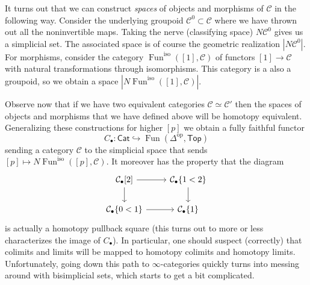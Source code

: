 \documentclass{amsart}
\DeclareMathOperator{\Fun}{Fun}
\begin{document}
It turns out that we can construct \textit{spaces} of objects and morphisms of $\mathcal{C}$ in the following way.
Consider the underlying groupoid $\mathcal{C}^0\subset \mathcal{C}$ where
we have thrown out all the noninvertible maps. Taking the nerve (classifying space) $N\mathcal{C}^0$
gives us a simplicial set. The associated space is of course the geometric realization $|N\mathcal{C}^0|$. 
For morphisms, consider the category $\Fun^\text{iso}([1], \mathcal{C})$ of functors $[1]\to\mathcal{C}$
with natural transformations through isomorphisms. This category is a also a groupoid, so we obtain
a space $|N\Fun^\text{iso}([1],\mathcal{C})|$.

Observe now that if we have two equivalent categories $\mathcal{C}\simeq \mathcal{C}'$ then
the spaces of objects and morphisms that we have defined above will be homotopy equivalent.
Generalizing these constructions for higher $[p]$ we obtain a fully faithful functor
\begin{equation*}
    C_\bullet:\mathsf{Cat}\hookrightarrow \Fun(\Delta^\text{op},\mathsf{Top})
\end{equation*}
sending a category $\mathcal{C}$ to the simplicial space that sends $[p]\mapsto N\Fun^\text{iso}([p],\mathcal{C})$.
It moreover has the property that the diagram
\begin{equation*}
    \begin{tikzcd}
        \mathcal{C}_\bullet[2] \rar\dar & \mathcal{C}_\bullet\{1<2\}\dar \\
        \mathcal{C}_\bullet\{0<1\} \rar & \mathcal{C}_\bullet\{1\}
    \end{tikzcd}
\end{equation*}
is actually a homotopy pullback square (this turns out to more or less characterizes the
image of $C_\bullet$). In particular, one should suspect (correctly) that colimits
and limits will be mapped to homotopy colimits and homotopy limits.
Unfortunately, going down this path to $\infty$-categories quickly turns into messing around with
bisimplicial sets, which starts to get a bit complicated.
\end{document}
